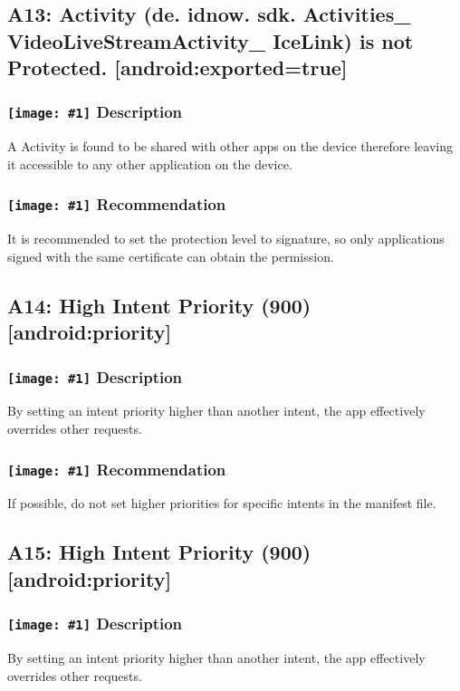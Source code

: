 \documentclass[12p]{article}
\newcommand{\icon}[1]{\texttt{[image: \#1]}}
\begin{document}
\subsection{A13: Activity (de. idnow. sdk. Activities\_ VideoLiveStreamActivity\_ IceLink) is not Protected. [android:exported=true]}
\subsubsection*{\protect\icon{/home/miki/Documents/GITHUB/AndroidPermissions/python/vulns/report_icons/basic_sheet.png} Description}
A Activity is found to be shared with other apps on the device therefore leaving it accessible to any other application on the device.
\subsubsection*{\protect\icon{/home/miki/Documents/GITHUB/AndroidPermissions/python/vulns/report_icons/basic_todo.png} Recommendation}
It is recommended to set the protection level to signature, so only applications signed with the same certificate can obtain the permission.
\subsection{A14: High Intent Priority (900) [android:priority]}
\subsubsection*{\protect\icon{/home/miki/Documents/GITHUB/AndroidPermissions/python/vulns/report_icons/basic_sheet.png} Description}
By setting an intent priority higher than another intent, the app effectively overrides other requests.
\subsubsection*{\protect\icon{/home/miki/Documents/GITHUB/AndroidPermissions/python/vulns/report_icons/basic_todo.png} Recommendation}
If possible, do not set higher priorities for specific intents in the manifest file.
\subsection{A15: High Intent Priority (900) [android:priority]}
\subsubsection*{\protect\icon{/home/miki/Documents/GITHUB/AndroidPermissions/python/vulns/report_icons/basic_sheet.png} Description}
By setting an intent priority higher than another intent, the app effectively overrides other requests.
\end{document}
